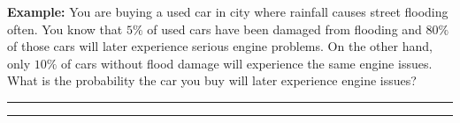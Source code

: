 \documentclass[oneside]{amsart}
\makeatletter
\def\vhrulefill#1{\leavevmode\leaders\hrule\@height#1\hfill \kern\z@}
\theoremstyle{definition}
\theoremstyle{definition}
\makeatother
\begin{document}
\vspace{5mm}

\newpage

\textbf{Example:} You are buying a used car in city where rainfall causes street flooding often. You know that $5 \%$ of used cars have been damaged from flooding and $80 \%$ of those cars will later experience serious engine problems. On the other hand, only $10 \%$ of cars without flood damage will experience the same engine issues. What is the probability the car you buy will later experience engine issues?

\vfill
\vfill

\vhrulefill{2pt}

\vspace{1mm}
\vhrulefill{2pt}
\\
\end{document}
